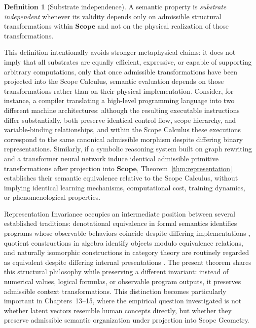 \documentclass[11pt,twoside,openright]{book}
\numberwithin{equation}{chapter}
\theoremstyle{definition}
\newtheorem{definition}{Definition}[chapter]
\theoremstyle{plain}
\theoremstyle{remark}
\theoremstyle{definition}
\newcommand{\CatScope}{\mathbf{Scope}}
\begin{document}
\begin{definition}[Substrate independence]
A semantic property is \emph{substrate independent} whenever its validity
depends only on admissible structural transformations within $\CatScope$
and not on the physical realization of those transformations.
\end{definition}

This definition intentionally avoids stronger metaphysical claims: it
does not imply that all substrates are equally efficient, expressive, or
capable of supporting arbitrary computations, only that once admissible
transformations have been projected into the Scope Calculus, semantic
evaluation depends on those transformations rather than on their physical
implementation. Consider, for instance, a compiler translating a
high-level programming language into two different machine
architectures: although the resulting executable instructions differ
substantially, both preserve identical control flow, scope hierarchy, and
variable-binding relationships, and within the Scope Calculus these
executions correspond to the same canonical admissible morphism despite
differing binary representations. Similarly, if a symbolic reasoning
system built on graph rewriting and a transformer neural network induce
identical admissible primitive transformations after projection into
$\CatScope$, Theorem~\ref{thm:representation} establishes their semantic
equivalence relative to the Scope Calculus, without implying identical
learning mechanisms, computational cost, training dynamics, or
phenomenological properties.

Representation Invariance occupies an intermediate position between
several established traditions: denotational equivalence in formal
semantics identifies programs whose observable behaviors coincide despite
differing implementations \cite{Scott1970,Winskel1993}, quotient
constructions in algebra identify objects modulo equivalence relations,
and naturally isomorphic constructions in category theory are routinely
regarded as equivalent despite differing internal presentations
\cite{MacLane1998,Awodey2010}. The present theorem shares this structural
philosophy while preserving a different invariant: instead of numerical
values, logical formulas, or observable program outputs, it preserves
admissible context transformations. This distinction becomes
particularly important in Chapters~13--15, where the empirical question
investigated is not whether latent vectors resemble human concepts
directly, but whether they preserve admissible semantic organization
under projection into Scope Geometry.
\end{document}
